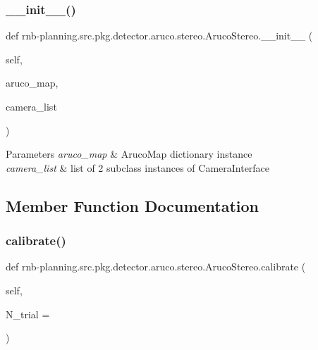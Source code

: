\subsubsection{\texorpdfstring{\+\_\+\+\_\+init\+\_\+\+\_\+()}{\_\_init\_\_()}}
{\footnotesize\ttfamily def rnb-\/planning.\+src.\+pkg.\+detector.\+aruco.\+stereo.\+Aruco\+Stereo.\+\_\+\+\_\+init\+\_\+\+\_\+ (\begin{DoxyParamCaption}\item[{}]{self,  }\item[{}]{aruco\+\_\+map,  }\item[{}]{camera\+\_\+list }\end{DoxyParamCaption})}


\begin{DoxyParams}{Parameters}
{\em aruco\+\_\+map} & Aruco\+Map dictionary instance \\
\hline
{\em camera\+\_\+list} & list of 2 subclass instances of Camera\+Interface \\
\hline
\end{DoxyParams}


\subsection{Member Function Documentation}
\mbox{\label{classrnb-planning_1_1src_1_1pkg_1_1detector_1_1aruco_1_1stereo_1_1_aruco_stereo_a7d271e9c3824f8e206b3b10ac253f795}} 
\subsubsection{\texorpdfstring{calibrate()}{calibrate()}}
{\footnotesize\ttfamily def rnb-\/planning.\+src.\+pkg.\+detector.\+aruco.\+stereo.\+Aruco\+Stereo.\+calibrate (\begin{DoxyParamCaption}\item[{}]{self,  }\item[{}]{N\+\_\+trial = {} }\end{DoxyParamCaption})}



